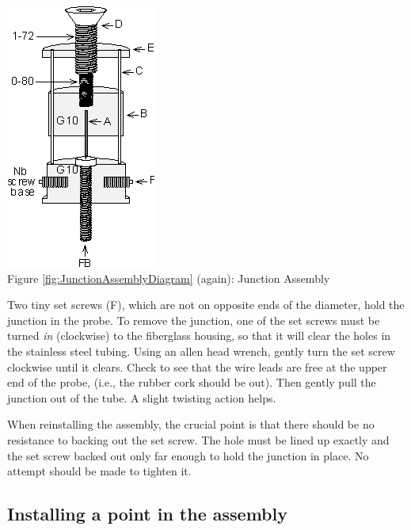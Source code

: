 \documentclass{../lab}
\begin{document}
\begin{center}
    \href{http://experimentationlab.berkeley.edu/sites/default/files/images/JOS5.gif}{\includegraphics[width=0.5\linewidth]{images/JOS5.png}} \\
    Figure \ref{fig:JunctionAssemblyDiagram} (again): Junction Assembly
\end{center}

Two tiny set screws (F), which are not on opposite ends of the diameter, hold the junction in the probe. To remove the junction, one of the set screws must be turned \emph{in} (clockwise) to the fiberglass housing, so that it will clear the holes in the stainless steel tubing. Using an allen head wrench, gently turn the set screw clockwise until it clears. Check to see that the wire leads are free at the upper end of the probe, (i.e., the rubber cork should be out). Then gently pull the junction out of the tube. A slight twisting action helps.

When reinstalling the assembly, the crucial point is that there should be no resistance to backing out the set screw. The hole must be lined up exactly and the set screw backed out only far enough to hold the junction in place. No attempt should be made to tighten it.

\subsection{Installing a point in the assembly}
\end{document}
